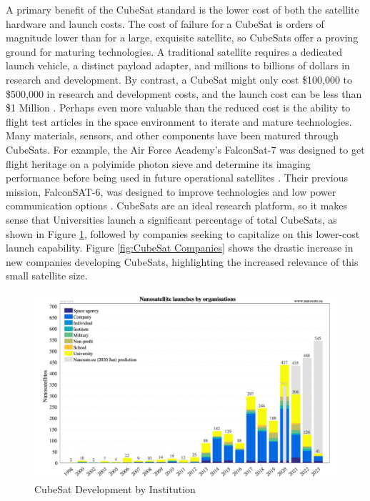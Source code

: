 A primary benefit of the CubeSat standard is the lower cost of both the satellite hardware and launch costs. The cost of failure for a CubeSat is orders of magnitude lower than for a large, exquisite satellite, so CubeSats offer a proving ground for maturing technologies. A traditional satellite requires a dedicated launch vehicle, a distinct payload adapter, and millions to billions of dollars in research and development. By contrast, a CubeSat might only cost \$100,000 to \$500,000 in research and development costs, and the launch cost can be less than \$1 Million \citep{Wertz2011SpaceSMAD}. Perhaps even more valuable than the reduced cost is the ability to flight test articles in the space environment to iterate and mature technologies. Many materials, sensors, and other components have been matured through CubeSats. For example, the Air Force Academy's FalconSat-7 was designed to get flight heritage on a polyimide photon sieve and determine its imaging performance before being used in future operational satellites \citep{FalconSat7}. Their previous mission, FalconSAT-6, was designed to improve  technologies and low power communication options \citep{FalconSat6}. CubeSats are an ideal research platform, so it makes sense that Universities launch a significant percentage of total CubeSats, as shown in Figure \ref{fig:CubeSat Development by Institution}, followed by companies seeking to capitalize on this lower-cost launch capability. Figure \ref{fig:CubeSat Companies} shows the drastic increase in new companies developing CubeSats, highlighting the increased relevance of this small satellite size.

\begin{figure}
    \centering
    \includegraphics[width=\textwidth]{Thesis/Literature_Review/Lit Review Figures/launch institutions.png}
    \caption{CubeSat Development by Institution}
    \label{fig:CubeSat Development by Institution}
\end{figure}

